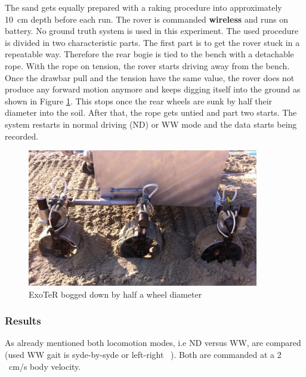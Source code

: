 \documentclass[a4paper,twocolumn]{esapub2005} %
\begin{document}

The sand gets equally prepared with a raking procedure into approximately 10~\unit{cm} depth before each run.  The rover is commanded \textbf{wireless} and runs on battery. No ground truth system is used in this experiment. The used procedure is divided in two characteristic parts. The first part is to get the rover stuck in a repeatable way. Therefore the rear bogie is tied to the bench with a detachable rope. With the rope on tension, the rover starts driving away from the bench. Once the drawbar pull and the tension have the same value, the rover does not produce any forward motion anymore and keeps digging itself into the ground as shown in Figure \ref{fig:volleyexoterdigg}. This stops once the rear wheels are sunk by half their diameter into the soil. After that, the rope gets untied and part two starts. The system restarts in normal driving (ND) or WW mode and the data starts being recorded. 

\begin{figure}[h!]
    \centering
    \includegraphics[width=0.9\textwidth]{volleyexoterdigg.jpg}
    \caption{ExoTeR bogged down by half a wheel diameter}
    \label{fig:volleyexoterdigg}
\end{figure}

\subsubsection{Results} As already mentioned both locomotion modes, i.e ND versus WW, are compared (used WW gait is syde-by-syde or left-right ~\cite{LucWalkingGaits}). Both are commanded at a 2 ~\unit{cm/s}
body velocity.
\end{document}
